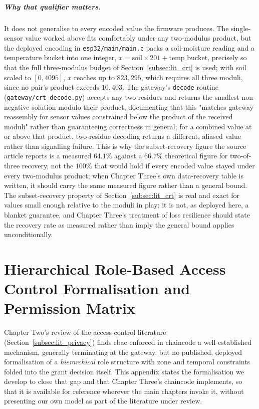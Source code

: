 \paragraph{Why that qualifier matters.} It does not generalise to every
encoded value the firmware produces. The single-sensor value worked above
fits comfortably under any two-modulus product, but the deployed encoding
in \texttt{esp32/main/main.c} packs a soil-moisture reading and a
temperature bucket into one integer, $x = \mathrm{soil}\times 201 +
\mathrm{temp\_bucket}$, precisely so that the full three-modulus budget of
Section~\ref{subsec:lit_crt} is used; with soil scaled to
$[0,4095]$, $x$ reaches up to $823{,}295$, which requires all three
moduli, since no pair's product exceeds $10{,}403$. The gateway's
\texttt{decode} routine (\texttt{gateway/crt\_decode.py}) accepts any two
residues and returns the smallest non-negative solution modulo their
product, documenting that this "matches gateway reassembly for sensor
values constrained below the product of the received moduli" rather than
guaranteeing correctness in general; for a combined value at or above
that product, two-residue decoding returns a different, aliased value
rather than signalling failure. This is why the subset-recovery figure
the source article reports is a measured $64.1\%$ against a $66.7\%$
theoretical figure for two-of-three recovery, not the $100\%$ that would
hold if every encoded value stayed under every two-modulus product; when
Chapter Three's own data-recovery table is written, it should carry the
same measured figure rather than a general bound. The
subset-recovery property of Section~\ref{subsec:lit_crt} is real and
exact for values small enough relative to the moduli in play; it is not,
as deployed here, a blanket guarantee, and Chapter Three's treatment of
loss resilience should state the recovery rate as measured rather than
imply the general bound applies unconditionally.

\chapter{Hierarchical Role-Based Access Control Formalisation and Permission
Matrix}
\label{app:hrbac_matrix}

Chapter Two's review of the access-control literature
(Section~\ref{subsec:lit_privacy}) finds \gls{rbac} enforced in chaincode a
well-established mechanism, generally terminating at the gateway, but no
published, deployed formalisation of a \emph{hierarchical} role structure
with zone and temporal constraints folded into the grant decision itself.
This appendix states the formalisation we develop to close that gap and
that Chapter Three's chaincode implements, so that it is available for
reference wherever the main chapters invoke it, without presenting our own
model as part of the literature under review.

